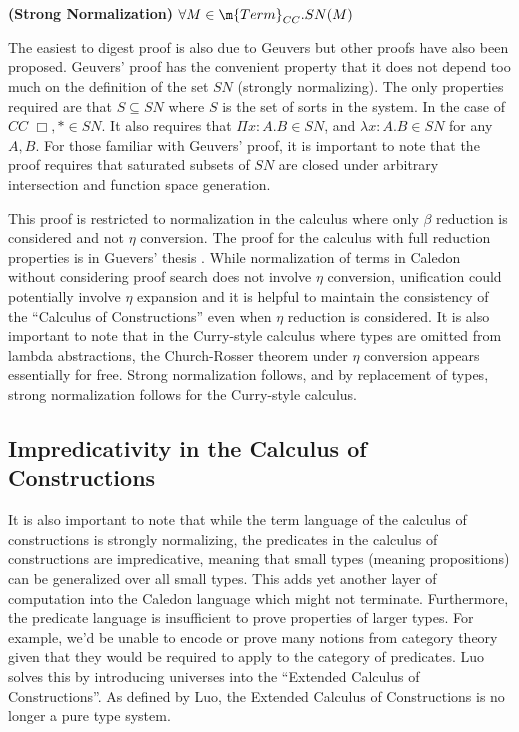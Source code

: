 \begin{theorem}
\textbf{(Strong Normalization)} $\forall M \in \m{Term}_{CC}. SN(M)$
\label{cc:cons}
\end{theorem}

The easiest to digest proof is also due to Geuvers \citep{Geuvers94ashort} 
but other proofs have also been proposed.  Geuvers' proof has the convenient
property that it does not depend too much on the definition of the set $SN$ 
(strongly normalizing). The only properties required are that $S \subseteq SN$ 
where $S$ is the set of sorts in the system. In the case of $CC$ $\Box,* \in SN$.
It also requires that $\Pi x : A . B \in SN$, and $\lambda x : A . B \in SN$ 
for any $A,B$.  For those familiar with Geuvers' proof, 
it is important to note that the proof requires that saturated subsets of $SN$ are closed under
arbitrary intersection and function space generation.

This proof is restricted to normalization in the calculus where only $\beta$ reduction 
is considered and not $\eta$ conversion.  The proof for the calculus with full reduction properties is
in Guevers' thesis \citep{geuvers1993logics}.  While normalization of terms in Caledon without considering proof search does
not involve $\eta$ conversion, unification could potentially involve $\eta$ expansion and it is helpful to maintain
the consistency of the ``Calculus of Constructions'' even when $\eta$ reduction is considered.  
It is also important to note that in the Curry-style calculus where types are omitted from lambda abstractions, 
the Church-Rosser theorem under $\eta$ conversion appears essentially for free\citep{miquel2001implicit}. Strong normalization 
follows, and by replacement of types, strong normalization follows for the Curry-style calculus.

\subsection{Impredicativity in the Calculus of Constructions}

It is also important to note that while the term language of the calculus of constructions is strongly normalizing, 
the predicates in the calculus of constructions are impredicative, meaning that small types (meaning propositions) can be generalized over all small types.
This adds yet another layer of computation into the Caledon language which might not terminate.  
Furthermore, the predicate language is insufficient to prove properties of larger types.  For example, 
we'd be unable to encode or prove many notions from category theory given that they would be required to apply to the 
category of predicates.  
Luo \citep{luo1989ecc} solves this by introducing universes into the ``Extended Calculus of Constructions''.  
As defined by Luo, the Extended Calculus of Constructions is no longer a pure type system.


